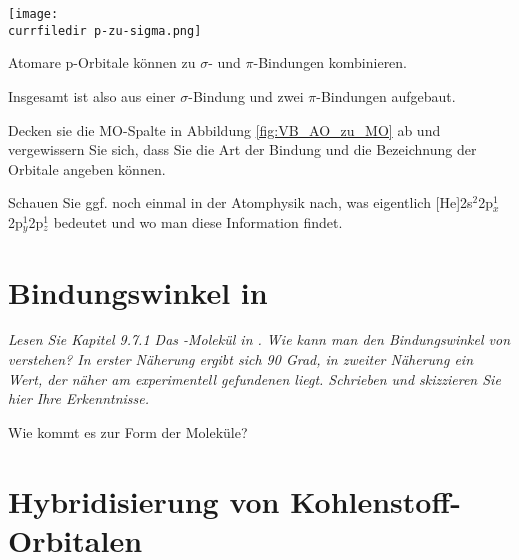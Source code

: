 %
\begin{marginfigure}
\texttt{[image: \\currfiledir p-zu-sigma.png]}
\caption{Atomare p-Orbitale können zu $\sigma$- und $\pi$-Bindungen kombinieren. }
\end{marginfigure}
%

Insgesamt ist  also aus einer $\sigma$-Bindung und zwei $\pi$-Bindungen aufgebaut.


\begin{questions} 
\item Decken sie die MO-Spalte in Abbildung  \ref{fig:VB_AO_zu_MO} ab und vergewissern Sie sich, dass Sie die Art der Bindung und die Bezeichnung der Orbitale angeben können.

\item Schauen Sie ggf. noch einmal in der Atomphysik nach, was eigentlich [He]2s$^2$2p$_x^1$2p$_y^1$2p$_z^1$ bedeutet und wo man diese Information findet.
\end{questions}



\section{Bindungswinkel  in  }


\textit{Lesen Sie Kapitel 9.7.1 Das -Molekül in \cite{Demtröder_ep3}. Wie kann man den Bindungswinkel von  verstehen? In erster Näherung ergibt sich 90 Grad, in zweiter Näherung ein Wert, der näher am experimentell gefundenen liegt. \newline Schrieben und skizzieren Sie hier Ihre Erkenntnisse. }

\vspace*{5cm}

\newpage

\vspace*{5cm}

\begin{questions} 
\item Wie kommt es zur Form der Moleküle?
\end{questions}


\section{Hybridisierung von Kohlenstoff-Orbitalen}

